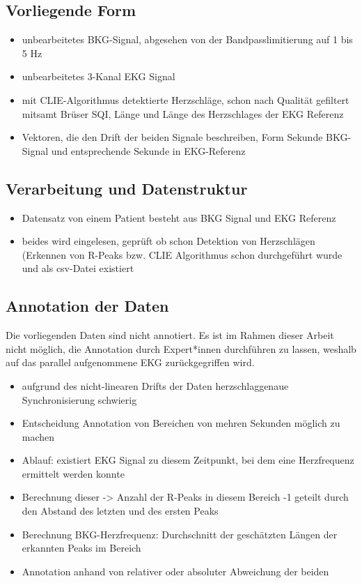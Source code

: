 	\subsection{Vorliegende Form}
	
	\begin{itemize}
		\item unbearbeitetes \ac{BKG}-Signal, abgesehen von der Bandpasslimitierung auf 1 bis 5 Hz
		\item unbearbeitetes 3-Kanal EKG Signal
		\item mit CLIE-Algorithmus detektierte Herzschläge, schon nach Qualität gefiltert mitsamt Brüser SQI, Länge und Länge des Herzschlages der EKG Referenz
		\item Vektoren, die den Drift der beiden Signale beschreiben, Form Sekunde \ac{BKG}-Signal und entsprechende Sekunde in \ac{EKG}-Referenz
	\end{itemize}
	
	\subsection{Verarbeitung und Datenstruktur}
	
	\begin{itemize}
		\item Datensatz von einem Patient besteht aus BKG Signal und EKG Referenz
		\item beides wird eingelesen, geprüft ob schon Detektion von Herzschlägen (Erkennen von R-Peaks bzw. CLIE Algorithmus schon durchgeführt wurde und als csv-Datei existiert
	\end{itemize}

	\subsection{Annotation der Daten}
	
	Die vorliegenden Daten sind nicht annotiert. Es ist im Rahmen dieser Arbeit nicht möglich, die Annotation durch Expert*innen durchführen zu lassen, weshalb auf das parallel aufgenommene \ac{EKG} zurückgegriffen wird.
	
	\begin{itemize}
		\item aufgrund des nicht-linearen Drifts der Daten herzschlaggenaue Synchronisierung schwierig
		\item Entscheidung Annotation von Bereichen von mehren Sekunden möglich zu machen
		\item Ablauf: existiert EKG Signal zu diesem Zeitpunkt, bei dem eine Herzfrequenz ermittelt werden konnte
		\item Berechnung dieser -> Anzahl der R-Peaks in diesem Bereich -1 geteilt durch den Abstand des letzten und des ersten Peaks
		\item Berechnung \ac{BKG}-Herzfrequenz: Durchschnitt der geschätzten Längen der erkannten Peaks im Bereich
		\item Annotation anhand von relativer oder absoluter Abweichung der beiden
	\end{itemize}
	

